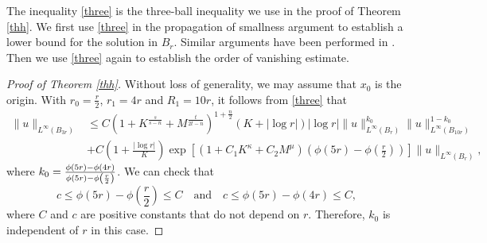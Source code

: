\documentclass[11pt]{amsart}
\theoremstyle{plain}
\numberwithin{equation}{section}
\begin{document}
The inequality \eqref{three} is the three-ball inequality we use in
the proof of Theorem \ref{thh}. We first use \eqref{three} in the
propagation of smallness argument to establish a lower bound for the
solution in $B_r$. Similar arguments have been performed in
\cite{Zhu16}. Then we use \eqref{three} again to establish the order
of vanishing estimate.

\begin{proof} [Proof of Theorem  \ref{thh}] Without loss of
generality, we may assume that $x_0$ is the origin.  With
$r_0=\frac{r}{2}$, $r_1=4r$ and $R_1=10r$, it follows from
\eqref{three} that
\begin{align}
\|u\|_{L^\infty {\left( {B_{3r}} \right) }}
&\le C {\left( {1 + K^{\frac{s}{s-n}} + M^{\frac{t}{2t-n}}} \right) }^{1+\frac n 2} {\left( {K+|\log r|} \right) } |\log r|  \|u\|_{L^{\infty}(B_{r})}^{k_0} \|u\|_{L^{\infty}(B_{10r})}^{1 - k_0} \nonumber \\
&+C{\left( {1 + \frac{{\left\vert{\log r}\right\vert}}{K}} \right) } \exp{\left[{ {\left( {1 + C_1 K^\kappa + C_2 M^\mu} \right) } {\left( {\phi{\left( {5r} \right) }-\phi{\left( {\frac r 2} \right) }} \right) } }\right]} \|u\|_{L^{\infty}(B_{r})},
\label{refi}
\end{align}
where ${\displaystyle} k_0 = \frac{\phi(5r)-\phi(4r)}{\phi(5r)-\phi{\left( {\frac r 2} \right) }}$.
We can check that
$$c\leq \phi(5r)-\phi{\left( {\frac{r}{2}} \right) }\leq C \quad \mbox{and} \quad c\leq \phi(5r)-\phi(4r)\leq C,$$
where $C$ and $c$ are positive constants that do not depend on $r$.
Therefore, $k_0$ is independent of $r$ in this case.


\end{proof}
\end{document}
